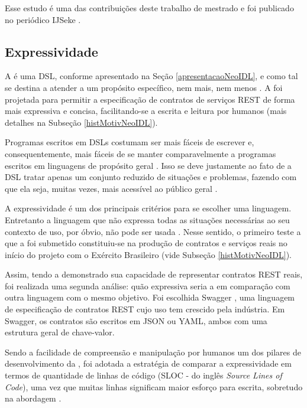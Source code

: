 Esse estudo é uma das contribuições deste trabalho de mestrado e foi publicado
no periódico IJSeke \cite{lima2015neoidl}.

\subsection{Expressividade}
\label{estudoExpressividadeNeoIDL}
\vspace{-6mm}

A \neoidl{} é uma DSL, conforme apresentado na Seção \ref{apresentacaoNeoIDL},
e como tal se destina a atender a um propósito específico, nem mais, nem menos
\cite{hudak1998modular}. A \neoidl{} foi projetada para permitir a
especificação de contratos de serviços REST de forma mais expressiva e concisa,
facilitando-se a escrita e leitura por humanos (mais detalhes na Subseção
\ref{histMotivNeoIDL}).

Programas escritos em DSLs costumam ser mais fáceis de escrever e,
consequentemente, mais fáceis de se manter comparavelmente a programas escritos
em linguagens de propósito geral \cite{hudak1998modular}. Isso se deve
justamente ao fato de a DSL tratar apenas um conjunto reduzido de situações e
problemas, fazendo com que ela seja, muitas vezes, mais acessível ao público
geral \cite{taha2008domain}.

A expressividade é um dos principais critérios para se escolher uma
linguagem. Entretanto a linguagem que não expressa todas as situações
necessárias ao seu contexto de uso, por óbvio, não pode ser usada
\cite{mackinlay1985expressiveness}. Nesse sentido, o primeiro teste a que a
\neoidl{} foi submetido constituiu-se na produção de contratos e serviços reais
no início do projeto com o Exército Brasileiro (vide Subseção \ref{histMotivNeoIDL}).

Assim, tendo a \neoidl{} demonstrado sua capacidade de representar contratos
REST reais, foi realizada uma segunda análise: quão expressiva seria a
\neoidl{} em comparação com outra linguagem com o mesmo objetivo. Foi escolhida
Swagger \cite{swaggerSite}, uma linguagem de especificação de contratos REST
cujo uso tem crescido pela indústria.
Em Swagger, os contratos são escritos em JSON\cite{JSon} ou YAML\cite{YAML},
ambos com uma estrutura geral de chave-valor.

Sendo a facilidade de compreensão e manipulação por humanos um dos pilares
de desenvolvimento da \neoidl{}, foi adotada a estratégia de comparar a
expressividade em termos de quantidade de linhas de código (SLOC - do inglês
\textit{Source Lines of Code}), uma vez que muitas linhas significam maior
esforço para escrita, sobretudo na abordagem \CtFirst{}.

